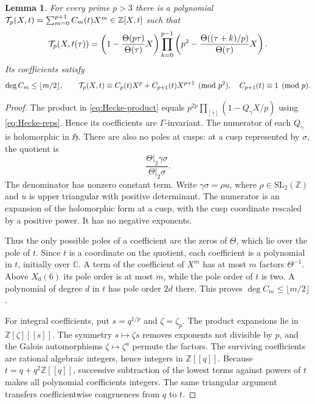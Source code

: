 \documentclass[11pt,a4paper]{article}
\newtheorem{lemma}[theorem]{Lemma}
\theoremstyle{remark}\newtheorem{remark}[theorem]{Remark}
\newcommand{\Z}{\mathbb Z}\newcommand{\Q}{\mathbb Q}
\newcommand{\C}{\mathbb C}\newcommand{\Fp}{\mathbb F_p}
\newcommand{\HH}{\mathfrak H}
\begin{document}
\begin{lemma}\label{lem:Hecke-core}
For every prime $p>3$ there is a polynomial
$\Tp(X,t)=\sum_{m=0}^{p+1}C_m(t)X^m\in\Z[X,t]$ such that
\begin{equation}\label{eq:Hecke-product}
 \mathcal T_p(X,t(\tau))=
 \left(1-\frac{\Theta(p\tau)}{\Theta(\tau)}X\right)
 \prod_{k=0}^{p-1}
 \left(p^2-\frac{\Theta((\tau+k)/p)}{\Theta(\tau)}X\right).
\end{equation}
Its coefficients satisfy
\begin{equation}\label{eq:Hecke-core}
 \deg C_m\le\lfloor m/2\rfloor,\qquad
 \mathcal T_p(X,t)\equiv C_p(t)X^p+C_{p+1}(t)X^{p+1}\pmod{p^2},
 \quad C_{p+1}(t)\equiv1\pmod p.
\end{equation}
\end{lemma}
\begin{proof}
The product in \eqref{eq:Hecke-product} equals
$p^{2p}\prod_{[\gamma]}(1-Q_\gamma X/p)$ using
\eqref{eq:Hecke-reps}. Hence its coefficients are $\Gamma$-invariant.
The numerator of each $Q_\gamma$ is holomorphic in $\HH$.
There are also no poles at cusps: at a cusp represented by $\sigma$,
the quotient is
\[
 \frac{\Theta|_2\gamma\sigma}{\Theta|_2\sigma}.
\]
The denominator has nonzero constant term. Write
$\gamma\sigma=\rho u$, where $\rho\in\mathrm{SL}_2(\Z)$ and $u$
is upper triangular with positive determinant. The numerator is an
expansion of the holomorphic form at a cusp, with the cusp coordinate
rescaled by a positive power. It has no negative exponents.

Thus the only possible poles of a coefficient are the zeros of $\Theta$,
which lie over the pole of $t$. Since $t$ is a coordinate on the quotient,
each coefficient is a polynomial in $t$, initially over $\C$.
A term of the coefficient of $X^m$ has at most $m$ factors $\Theta^{-1}$.
Above $X_0(6)$ its pole order is at most $m$, while the pole order of $t$
is two. A polynomial of degree $d$ in $t$ has pole order $2d$ there.
This proves $\deg C_m\le\lfloor m/2\rfloor$.

For integral coefficients, put $s=q^{1/p}$ and $\zeta=\zeta_p$.
The product expansions lie in $\Z[\zeta][[s]]$.
The symmetry $s\mapsto\zeta s$ removes exponents not divisible by $p$,
and the Galois automorphisms $\zeta\mapsto\zeta^a$ permute the factors.
The surviving coefficients are rational algebraic integers, hence integers
in $\Z[[q]]$. Because $t=q+q^2\Z[[q]]$, successive subtraction of the
lowest terms against powers of $t$ makes all polynomial coefficients
integers. The same triangular argument transfers coefficientwise
congruences from $q$ to $t$.


\end{proof}
\end{document}
